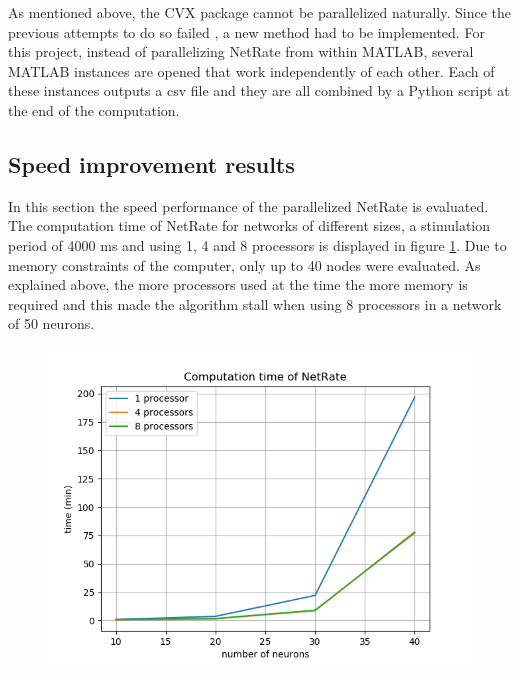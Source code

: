 \documentclass[11pt]{article}
\begin{document}
As mentioned above, the CVX package cannot be parallelized naturally. Since the previous attempts to do so failed \cite{pranav_report}, a new method had to be implemented. For this project, instead of parallelizing NetRate from within MATLAB, several MATLAB instances are opened that work independently of each other. Each of these instances outputs a csv file and they are all combined by a Python script at the end of the computation. 

\subsection{Speed improvement results}

In this section the speed performance of the parallelized NetRate is evaluated. The computation time of NetRate for networks of different sizes, a stimulation period of 4000 ms and using 1, 4 and 8 processors is displayed in figure \ref{fig:speed_netrate}. Due to memory constraints of the computer, only up to 40 nodes were evaluated. As explained above, the more processors used at the time the more memory is required and this made the algorithm stall when using 8 processors in a network of 50 neurons.

\begin{figure}
	\centering
	\includegraphics[width=0.8\linewidth]{computation_time_netrate.png}
	\label{fig:speed_netrate}
\end{figure}
\end{document}
